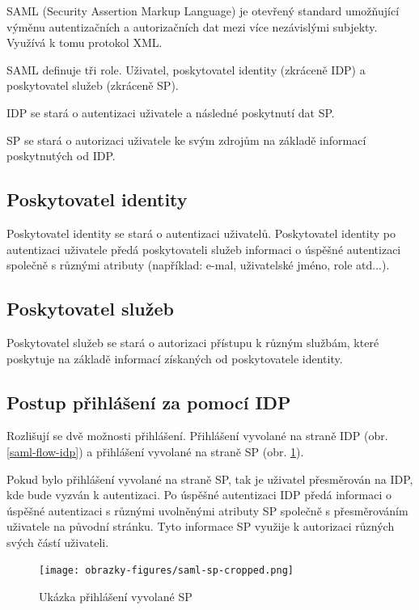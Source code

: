 SAML\cite{SAMLofficialSite}\cite{WhatIsSaml} (Security Assertion Markup Language) je otevřený standard umožňující výměnu autentizačních a autorizačních dat mezi více nezávislými subjekty. Využívá k tomu protokol XML. 

SAML definuje tři role. Uživatel, poskytovatel identity (zkráceně IDP) a poskytovatel služeb (zkráceně SP). 

IDP se stará o autentizaci uživatele a následné poskytnutí dat SP.

SP se stará o autorizaci uživatele ke svým zdrojům na základě informací poskytnutých od IDP.


\subsection{Poskytovatel identity}

Poskytovatel identity se stará o autentizaci uživatelů. Poskytovatel identity po autentizaci uživatele předá poskytovateli služeb informaci o úspěšné autentizaci společně s různými atributy (například: e-mal, uživatelské jméno, role atd...).

\subsection{Poskytovatel služeb}

Poskytovatel služeb se stará o autorizaci přístupu k různým službám, které poskytuje na základě informací získaných od poskytovatele identity.

\subsection{Postup přihlášení za pomocí IDP}\label{IDPlogin}

Rozlišují se dvě možnosti přihlášení. Přihlášení vyvolané na straně IDP (obr. \ref{saml-flow-idp}) a přihlášení vyvolané na straně SP (obr. \ref{saml-flow-sp}).


Pokud bylo přihlášení vyvolané na straně SP, tak je uživatel přesměrován na IDP, kde bude vyzván k autentizaci.
Po úspěšné autentizaci IDP předá informaci o úspěšné autentizaci s různými uvolněnými atributy SP společně s přesměrováním uživatele na původní stránku.
Tyto informace SP využije k autorizaci různých svých částí uživateli.\cite{SAMLxOIDC}
\begin{figure}[!thbp]
	\centering
    \texttt{[image: obrazky-figures/saml-sp-cropped.png]}
	\caption{Ukázka přihlášení vyvolané SP\cite{SAMLxOIDC}}
	\label{saml-flow-sp}
\end{figure}

